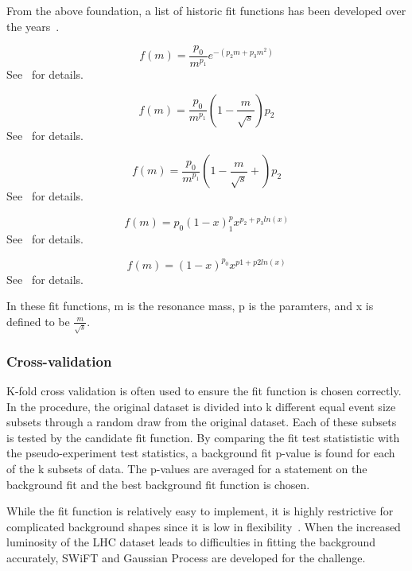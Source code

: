 From the above foundation, a list of historic fit functions has been developed over the years~\cite{Pachal:2063032}.

    \begin{equation}
        f(m)=\frac{p_{0}}{m^{p_{1}}}e^{-(p_{2}m+p_{3}m^{2})}
    \end{equation}See~\cite{UA2:1990gao} for details.

    \begin{equation}
        f(m)=\frac{p_{0}}{m^{p_{1}}}(1-\frac{m}{\sqrt{s}})p_{2}
    \end{equation}See~\cite{1995} for details.

    \begin{equation}
        f(m)=\frac{p_{0}}{m^{p_{1}}}(1-\frac{m}{\sqrt{s}}+)p_{2}
    \end{equation}See~\cite{b582dc2d9c234174bfe2adbc9729bf42} for details.

    \begin{equation}
        f(m)=p_{0}(1-x)^p_{1}x^{p_{2}+p_{3}ln(x)}
    \end{equation}See~\cite{2009} for details.

    \begin{equation}
        f(m)=(1-x)^{p_{0}}x^{p1+p2ln(x)}
    \end{equation}See~\cite{2014} for details.

    In these fit functions, m is the resonance mass, p is the paramters, and x is defined to be $\frac{m}{\sqrt{s}}$.

\subsubsection{Cross-validation}
K-fold cross validation is often used to ensure the fit function is chosen correctly. In the procedure, the original dataset is divided into k different equal event size subsets through a random draw from the original dataset. Each of these subsets is tested by the candidate fit function. By comparing the fit test statististic with the pseudo-experiment test statistics, a background fit p-value is found for each of the k subsets of data. The p-values are averaged for a statement on the background fit and the best background fit function is chosen.

While the fit function is relatively easy to implement, it is highly restrictive for complicated background shapes since it is low in flexibility~\cite{ATL-PHYS-PUB-2020-028}. When the increased luminosity of the LHC dataset leads to difficulties in fitting the background accurately, SWiFT and Gaussian Process are developed for the challenge. 

